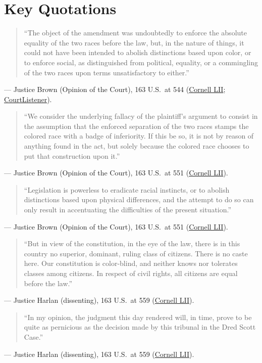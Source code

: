 \documentclass[12pt]{article}
\begin{document}
\section{Key Quotations}

\begin{quote}
``The object of the amendment was undoubtedly to enforce the absolute equality of the two races before the law, but, in the nature of things, it could not have been intended to abolish distinctions based upon color, or to enforce social, as distinguished from political, equality, or a commingling of the two races upon terms unsatisfactory to either.''
\end{quote}
\noindent --- Justice Brown (Opinion of the Court), 163 U.S.\ at 544 (\href{https://www.law.cornell.edu/supremecourt/text/163/537}{Cornell LII}; \href{https://www.courtlistener.com/opinion/94508/plessy-v-ferguson/}{CourtListener}).

\begin{quote}
``We consider the underlying fallacy of the plaintiff's argument to consist in the assumption that the enforced separation of the two races stamps the colored race with a badge of inferiority. If this be so, it is not by reason of anything found in the act, but solely because the colored race chooses to put that construction upon it.''
\end{quote}
\noindent --- Justice Brown (Opinion of the Court), 163 U.S.\ at 551 (\href{https://www.law.cornell.edu/supremecourt/text/163/537}{Cornell LII}).

\begin{quote}
``Legislation is powerless to eradicate racial instincts, or to abolish distinctions based upon physical differences, and the attempt to do so can only result in accentuating the difficulties of the present situation.''
\end{quote}
\noindent --- Justice Brown (Opinion of the Court), 163 U.S.\ at 551 (\href{https://www.law.cornell.edu/supremecourt/text/163/537}{Cornell LII}).

\begin{quote}
``But in view of the constitution, in the eye of the law, there is in this country no superior, dominant, ruling class of citizens. There is no caste here. Our constitution is color-blind, and neither knows nor tolerates classes among citizens. In respect of civil rights, all citizens are equal before the law.''
\end{quote}
\noindent --- Justice Harlan (dissenting), 163 U.S.\ at 559 (\href{https://www.law.cornell.edu/supremecourt/text/163/537}{Cornell LII}).

\begin{quote}
``In my opinion, the judgment this day rendered will, in time, prove to be quite as pernicious as the decision made by this tribunal in the Dred Scott Case.''
\end{quote}
\noindent --- Justice Harlan (dissenting), 163 U.S.\ at 559 (\href{https://www.law.cornell.edu/supremecourt/text/163/537}{Cornell LII}).
\end{document}
